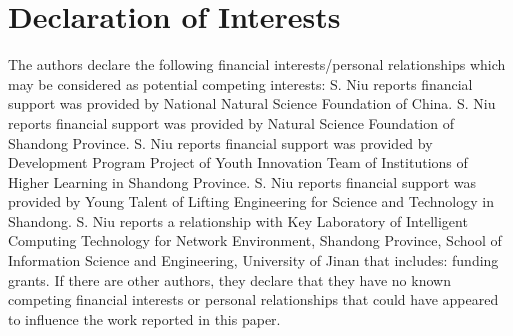 \documentclass[preprint,12pt]{elsarticle}
\begin{document}
\section*{Declaration of Interests}
The authors declare the following financial interests/personal relationships which may be considered as potential competing interests: S. Niu reports financial support was provided by National Natural Science Foundation of China. S. Niu reports financial support was provided by Natural Science Foundation of Shandong Province. S. Niu reports financial support was provided by Development Program Project of Youth Innovation Team of Institutions of Higher Learning in Shandong Province. S. Niu reports financial support was provided by Young Talent of Lifting Engineering for Science and Technology in Shandong. S. Niu reports a relationship with Key Laboratory of Intelligent Computing Technology for Network Environment, Shandong Province, School of Information Science and Engineering, University of Jinan that includes: funding grants. If there are other authors, they declare that they have no known competing financial interests or personal relationships that could have appeared to influence the work reported in this paper.


 


\end{document}
